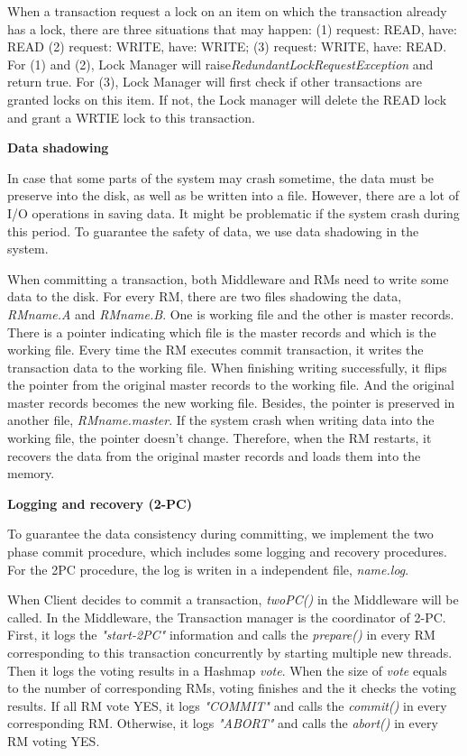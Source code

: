 \documentclass[a4paper, 12pt]{article}
\newcommand{\newPart}[1]{\textbf{\large #1}}
\begin{document}
When a transaction request a lock on an item on which the transaction already has a lock, there are three situations that may happen: (1) request: READ, have: READ (2) request: WRITE, have: WRITE; (3) request: WRITE, have: READ. For (1) and (2), Lock Manager will raise\textit{RedundantLockRequestException} and return true. For (3), Lock Manager will first check if other transactions are granted locks on this item. If not, the Lock manager will delete the READ lock and grant a WRTIE lock to this transaction.

\newPart{Data shadowing}

In case that some parts of the system may crash sometime, the data must be preserve into the disk, as well as be written into a file. However, there are a lot of I/O operations in saving data. It might be problematic if the system crash during this period. To guarantee the safety of data, we use data shadowing in the system. 

When committing a transaction, both Middleware and RMs need to write some data to the disk. For every RM, there are two files shadowing the data, \textit{RMname.A} and \textit{RMname.B}. One is working file and the other is master records. There is a pointer indicating which file is the master records and which is the working file. Every time the RM executes commit transaction, it writes the transaction data to the working file. When finishing writing successfully, it flips the pointer from the original master records to the working file. And the original master records becomes the new working file. Besides, the pointer is preserved in another file, \textit{RMname.master}. If the system crash when writing data into the working file, the pointer doesn't change. Therefore, when the RM restarts, it recovers the data from the original master records and loads them into the memory.

\newPart{Logging and recovery (2-PC)}

To guarantee the data consistency during committing, we implement the two phase commit procedure, which includes some logging and recovery procedures. For the 2PC procedure, the log is writen in a independent file, \textit{name.log}.

When Client decides to commit a transaction, \textit{twoPC()} in the Middleware will be called. In the Middleware, the Transaction manager is the coordinator of 2-PC. First, it logs the \textit{"start-2PC"} information and calls the \textit{prepare()} in every RM corresponding to this transaction concurrently by starting multiple new threads. Then it logs the voting results in a Hashmap \textit{vote}. When the size of \textit{vote} equals to the number of corresponding RMs, voting finishes and the it checks the voting results. If all RM vote YES, it logs \textit{"COMMIT"} and calls the \textit{commit()} in every corresponding RM. Otherwise, it logs \textit{"ABORT"} and calls the \textit{abort()} in every RM voting YES.
\end{document}
